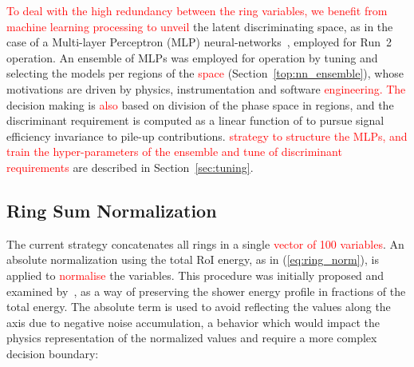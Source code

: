 \textcolor{red}{To deal with the high redundancy between the ring variables, we benefit from machine learning processing to unveil} the latent discriminating space, as in
the case of a Multi-layer Perceptron (MLP) neural-networks~\cite{haykin_2008},
employed for Run~2 operation. 
An ensemble of MLPs was employed for operation by tuning and selecting
the models per regions of the \eteta \textcolor{red}{space} (Section~\ref{top:nn_ensemble}), whose
motivations are driven by physics, instrumentation and software 
\textcolor{red}{engineering. The \rnn}
decision making is \textcolor{red}{also} based on division of the phase space in regions, and the discriminant requirement is
computed as a linear function of \avgmu to pursue signal efficiency invariance
to pile-up contributions. 
\textcolor{red}{strategy to structure the MLPs,  and train the hyper-parameters of the ensemble and tune of discriminant requirements }
are described in Section~\ref{sec:tuning}.


%

\subsection{Ring Sum Normalization}\label{top:pp}

The current strategy concatenates all rings in a single \textcolor{red}{vector of 100
variables}. An absolute normalization using the total RoI energy, as in
(\ref{eq:ring_norm}), is applied to \textcolor{red}{normalise} the variables. This procedure was
initially proposed and examined by~\cite{1995_seixas_ringer}, as a way of
preserving the shower energy profile in fractions of the total energy. The
absolute term is used to avoid reflecting the values along the axis due to
negative noise accumulation, a behavior which would impact the physics
representation of the normalized values and require a more complex decision
boundary:


